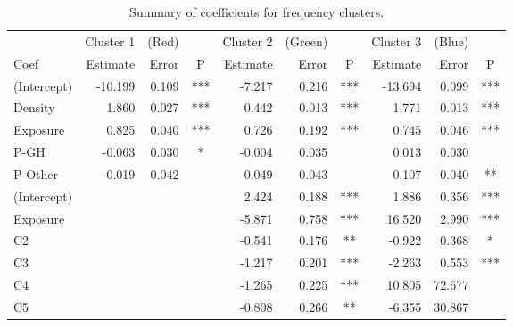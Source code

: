 \documentclass[11pt,letterpaper]{article}
\numberwithin{equation}{section}
\numberwithin{equation}{section}
\numberwithin{equation}{section}
\begin{document}
\begin{center}
\begin{table}
\caption{Summary of coefficients for frequency clusters.}
\label{frequencySummary}
\begin{tabular}{|l|rrc|rrc|rrc|}
\hline\hline
          & Cluster 1 & (Red) &   & Cluster 2 & (Green) &  & Cluster 3 & (Blue) &   \\
Coef        & Estimate  & Error & P   & Estimate  & Error   & P   & Estimate  & Error  & P  \\
 \hline
(Intercept) & -10.199   & 0.109 & *** & -7.217    & 0.216   & *** & -13.694   & 0.099  & *** \\
Density     & 1.860     & 0.027 & *** & 0.442     & 0.013   & *** & 1.771     & 0.013  & *** \\
Exposure    & 0.825     & 0.040 & *** & 0.726     & 0.192   & *** & 0.745     & 0.046  & *** \\
P-GH        & -0.063    & 0.030 & *   & -0.004    & 0.035   &     & 0.013     & 0.030  &     \\
P-Other     & -0.019    & 0.042 &     & 0.049     & 0.043   &     & 0.107     & 0.040  & **  \\
\hline
(Intercept) &          &      &    & 2.424     & 0.188   & *** & 1.886     & 0.356  & *** \\
Exposure    &          &      &    & -5.871    & 0.758   & *** & 16.520    & 2.990  & *** \\
C2          &          &      &    & -0.541    & 0.176   & **  & -0.922    & 0.368  & *   \\
C3          &          &      &    & -1.217    & 0.201   & *** & -2.263    & 0.553  & *** \\
C4          &          &      &    & -1.265    & 0.225   & *** & 10.805    & 72.677 &     \\
C5          &          &      &    & -0.808    & 0.266   & **  & -6.355    & 30.867 &   \\
\hline\hline
\end{tabular}
\end{table}
\end{center}



\end{document}
